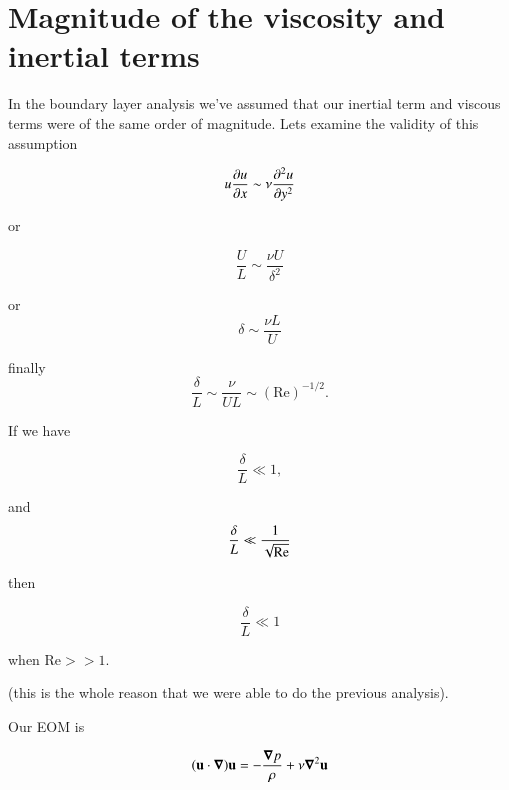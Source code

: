 \section{Magnitude of the viscosity and inertial terms}

In the boundary layer analysis we've assumed that our inertial term and viscous terms were of the same order of magnitude.  Lets examine the validity of this assumption

\begin{equation}\label{eqn:continuumL19:410}
u \PD{x}{u} \sim \nu \PDSq{y}{u}
\end{equation}

or

\begin{equation}\label{eqn:continuumL19:430}
\frac{U}{L} \sim \frac{\nu U}{\delta^2}
\end{equation}

or
\begin{equation}\label{eqn:continuumL19:450}
\delta  \sim \frac{\nu L}{U}
\end{equation}

finally
\begin{equation}\label{eqn:continuumL19:470}
\frac{\delta}{L} \sim \frac{\nu}{U L} \sim (\text{Re})^{-1/2}.
\end{equation}

If we have

\begin{equation}\label{eqn:continuumL19:490}
\frac{\delta}{L} \ll 1,
\end{equation}

and
\begin{equation}\label{eqn:continuumL19:510}
\frac{\delta}{L} \ll \inv{\sqrt{\text{Re}}}
\end{equation}

then

\begin{equation}\label{eqn:continuumL19:530}
\frac{\delta}{L} \ll 1
\end{equation}

when $\text{Re} >> 1$.

(this is the whole reason that we were able to do the previous analysis).

Our EOM is

\begin{equation}\label{eqn:continuumL19:550}
(\Bu \cdot \spacegrad) \Bu = -\frac{\spacegrad p}{\rho } + \nu \spacegrad^2 \Bu
\end{equation}


